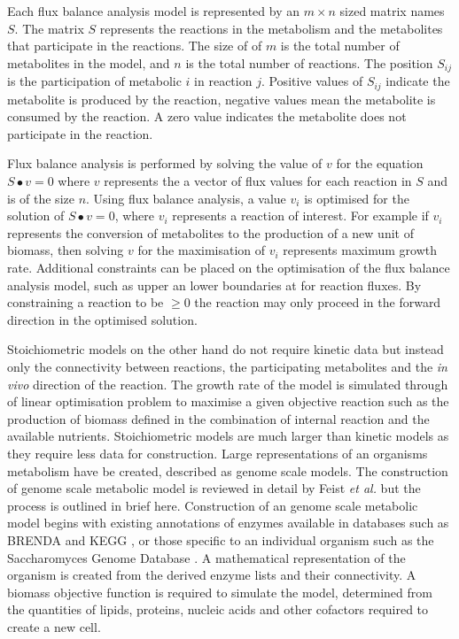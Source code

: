
Each flux balance analysis model is represented by an $m \times n$ sized matrix names $S$. The matrix $S$ represents the reactions in the metabolism and the metabolites that participate in the reactions. The size of of $m$ is the total number of metabolites in the model, and $n$ is the total number of reactions. The position $S_{ij}$ is the participation of metabolic $i$ in reaction $j$. Positive values of $S_{ij}$ indicate the metabolite is produced by the reaction, negative values mean the metabolite is consumed by the reaction. A zero value indicates the metabolite does not participate in the reaction.

Flux balance analysis is performed by solving the value of $v$ for the equation $S \bullet v = 0$ where $v$ represents the a vector of flux values for each reaction in $S$ and is of the size $n$. Using flux balance analysis, a value $v_{i}$ is optimised for the solution of $S \bullet v = 0$, where $v_{i}$ represents a reaction of interest. For example if $v_{i}$ represents the conversion of metabolites to the production of a new unit of biomass, then solving $v$ for the maximisation of $v_{i}$ represents maximum growth rate. Additional constraints can be placed on the optimisation of the flux balance analysis model, such as upper an lower boundaries at for reaction fluxes. By constraining a reaction to be $\geq 0$ the reaction may only proceed in the forward direction in the optimised solution.

Stoichiometric models on the other hand do not require kinetic data but instead only the connectivity between reactions, the participating metabolites and the \emph{in vivo} direction of the reaction. The growth rate of the model is simulated through of linear optimisation problem to maximise a given objective reaction such as the production of biomass defined in the combination of internal reaction and the available nutrients. Stoichiometric models are much larger than kinetic models as they require less data for construction. Large representations of an organisms metabolism have be created, described as genome scale models. The construction of genome scale metabolic model is reviewed in detail by Feist \emph{et al.} \cite{feist2009} but the process is outlined in brief here. Construction of an genome scale metabolic model begins with existing annotations of enzymes available in databases such as BRENDA \cite{chang2009} and KEGG \cite{okuda2008}, or those specific to an individual organism such as the Saccharomyces Genome Database \cite{cherry1997}. A mathematical representation of the organism is created from the derived enzyme lists and their connectivity. A biomass objective function is required to simulate the model, determined from the quantities of lipids, proteins, nucleic acids and other cofactors required to create a new cell.

